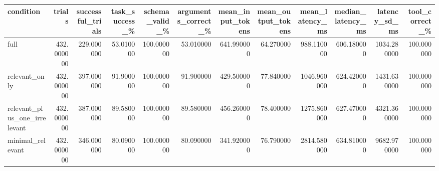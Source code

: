 \begin{tabular}{lrrrrrrrrrrr}
\toprule
condition & trials & successful\_trials & task\_success\_\% & schema\_valid\_\% & arguments\_correct\_\% & mean\_input\_tokens & mean\_output\_tokens & mean\_latency\_ms & median\_latency\_ms & latency\_sd\_ms & tool\_correct\_\% \\
\midrule
full & 432.000000 & 229.000000 & 53.010000 & 100.000000 & 53.010000 & 641.990000 & 64.270000 & 988.110000 & 606.180000 & 1034.280000 & 100.000000 \\
relevant\_only & 432.000000 & 397.000000 & 91.900000 & 100.000000 & 91.900000 & 429.500000 & 77.840000 & 1046.960000 & 624.420000 & 1431.630000 & 100.000000 \\
relevant\_plus\_one\_irrelevant & 432.000000 & 387.000000 & 89.580000 & 100.000000 & 89.580000 & 456.260000 & 78.400000 & 1275.860000 & 627.470000 & 4321.360000 & 100.000000 \\
minimal\_relevant & 432.000000 & 346.000000 & 80.090000 & 100.000000 & 80.090000 & 341.920000 & 76.790000 & 2814.580000 & 634.810000 & 9682.970000 & 100.000000 \\
\bottomrule
\end{tabular}
